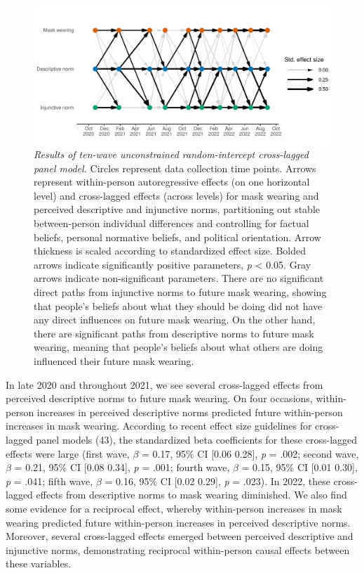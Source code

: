 \documentclass[
  man, donotrepeattitle,floatsintext]{apa6}
\begin{document}
\begin{figure}
\centering
\includegraphics{manuscript_files/figure-latex/plotRICLPM-1.pdf}
\caption{\label{fig:plotRICLPM}\emph{Results of ten-wave unconstrained random-intercept cross-lagged panel model.} Circles represent data collection time points. Arrows represent within-person autoregressive effects (on one horizontal level) and cross-lagged effects (across levels) for mask wearing and perceived descriptive and injunctive norms, partitioning out stable between-person individual differences and controlling for factual beliefs, personal normative beliefs, and political orientation. Arrow thickness is scaled according to standardized effect size. Bolded arrows indicate significantly positive parameters, \emph{p} \textless{} 0.05. Gray arrows indicate non-significant parameters. There are no significant direct paths from injunctive norms to future mask wearing, showing that people's beliefs about what they should be doing did not have any direct influences on future mask wearing. On the other hand, there are significant paths from descriptive norms to future mask wearing, meaning that people's beliefs about what others are doing influenced their future mask wearing.}
\end{figure}

In late 2020 and throughout 2021, we see several cross-lagged effects from perceived descriptive norms to future mask wearing. On four occasions, within-person increases in perceived descriptive norms predicted future within-person increases in mask wearing. According to recent effect size guidelines for cross-lagged panel models (43), the standardized beta coefficients for these cross-lagged effects were large (first wave, \(\beta\) = 0.17, 95\% CI {[}0.06 0.28{]}, \emph{p} = .002; second wave, \(\beta\) = 0.21, 95\% CI {[}0.08 0.34{]}, \emph{p} = .001; fourth wave, \(\beta\) = 0.15, 95\% CI {[}0.01 0.30{]}, \emph{p} = .041; fifth wave, \(\beta\) = 0.16, 95\% CI {[}0.02 0.29{]}, \emph{p} = .023). In 2022, these cross-lagged effects from descriptive norms to mask wearing diminished. We also find some evidence for a reciprocal effect, whereby within-person increases in mask wearing predicted future within-person increases in perceived descriptive norms. Moreover, several cross-lagged effects emerged between perceived descriptive and injunctive norms, demonstrating reciprocal within-person causal effects between these variables.
\end{document}
